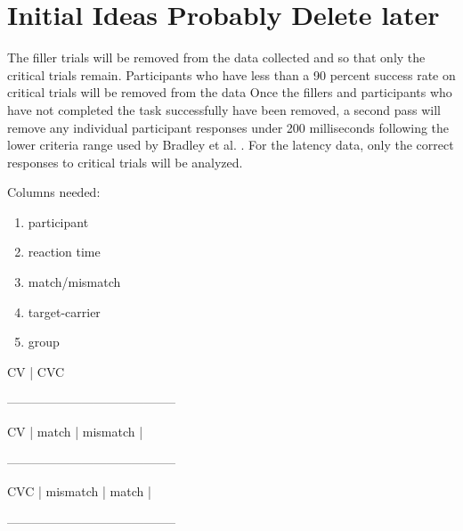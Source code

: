  
\section{Initial Ideas Probably Delete later}
The filler trials will be removed from the data collected and so that only the critical trials remain. Participants who have less than a 90 percent success rate on critical trials will be removed from the data %
Once the fillers and participants who have not completed the task successfully have been removed, a second pass will remove any individual participant responses under 200 milliseconds following the lower criteria range used by Bradley et al. \parencite*{Bradley1993-qq}. %
For the latency data, only the correct responses to critical trials will be analyzed.

Columns needed:
\begin{enumerate}
\item{participant}
\item{reaction time}
\item{match/mismatch}
\item{target-carrier}
\item{group}
\end{enumerate}


		CV	   |	CVC	
			
-----------------------------------------

CV	|     match	   |  mismatch |

-----------------------------------------

CVC |  mismatch |     match    |

-----------------------------------------




